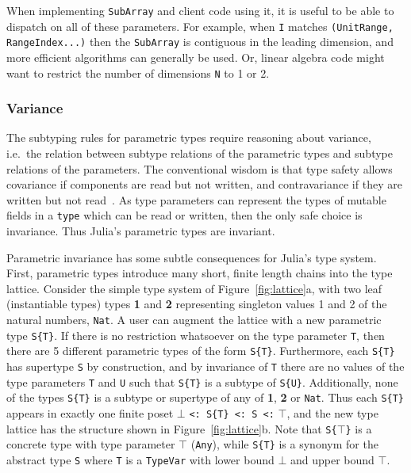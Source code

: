 \documentclass[pldi]{sigplanconf-pldi15}
\begin{document}
When implementing \verb|SubArray| and client code using it, it is useful
to be able to dispatch on all of these parameters. For example, when
\verb|I| matches \verb|(UnitRange, RangeIndex...)| then the \verb|SubArray|
is contiguous in the leading dimension, and more efficient algorithms can
generally be used. Or, linear algebra code might want to restrict the
number of dimensions \verb|N| to 1 or 2.

\subsubsection{Variance}

The subtyping rules for parametric types require reasoning about variance,
i.e.\ the relation between subtype relations of the parametric types and
subtype relations of the parameters. The conventional wisdom is that type
safety allows covariance if components are read but not written, and
contravariance if they are written but not read~\cite{Castagna1995}. As type
parameters can represent the types of mutable fields in a \verb|type| which can
be read or written, then the only safe choice is invariance. Thus Julia's
parametric types are invariant.

Parametric invariance has some subtle consequences for Julia's type system.
First, parametric types introduce many short, finite length chains into the
type lattice. Consider the simple type system of
Figure~\ref{fig:lattice}a, with two leaf (instantiable types) types \textbf{1}
and \textbf{2} representing singleton values 1 and 2 of the natural numbers,
\verb|Nat|. A user can augment the lattice with a new parametric type
\verb|S{T}|. If there is no restriction whatsoever on the type parameter
\verb|T|, then there are 5 different parametric types of the form \verb|S{T}|.
Furthermore, each \verb|S{T}| has supertype \verb|S| by construction, and by
invariance of \verb|T| there are no values of the type parameters \verb|T| and
\verb|U| such that \verb|S{T}| is a subtype of \verb|S{U}|. Additionally, none
of the types \verb|S{T}| is a subtype or supertype of any of \textbf{1},
\textbf{2} or \verb|Nat|. Thus each \verb|S{T}| appears in exactly one finite
poset $\bot$ \verb|<: S{T} <: S <:| $\top$, and the new type lattice has the
structure shown in Figure~\ref{fig:lattice}b. Note that \verb|S{|$\top$\verb|}|
is a concrete type with type parameter $\top$ (\verb|Any|), while \verb|S{T}|
is a synonym for the abstract type \verb|S| where \verb|T| is a \verb|TypeVar|
with lower bound $\bot$ and upper bound $\top$. 
\end{document}
